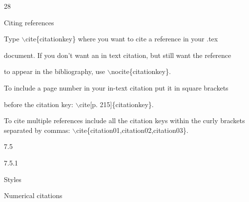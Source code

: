 \documentclass[a4paper,portrait,12pt]{article}
\begin{document}
28










\begin{flushleft}
Citing references
\end{flushleft}





\begin{flushleft}
Type \ensuremath{\backslash}cite\{citationkey\} where you want to cite a reference in your .tex
\end{flushleft}


\begin{flushleft}
document. If you don't want an in text citation, but still want the reference
\end{flushleft}


\begin{flushleft}
to appear in the bibliography, use \ensuremath{\backslash}nocite\{citationkey\}.
\end{flushleft}


\begin{flushleft}
To include a page number in your in-text citation put it in square brackets
\end{flushleft}


\begin{flushleft}
before the citation key: \ensuremath{\backslash}cite[p. 215]\{citationkey\}.
\end{flushleft}


\begin{flushleft}
To cite multiple references include all the citation keys within the curly brackets separated by commas: \ensuremath{\backslash}cite\{citation01,citation02,citation03\}.
\end{flushleft}





7.5


7.5.1





\begin{flushleft}
Styles
\end{flushleft}


\begin{flushleft}
Numerical citations
\end{flushleft}
\end{document}
